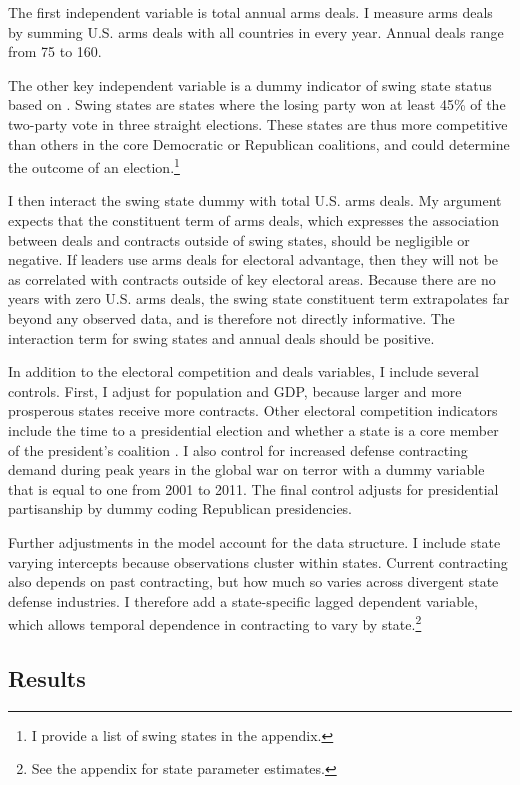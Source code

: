 \documentclass[12pt]{article}
\begin{document}
The first independent variable is total annual arms deals.  
I measure arms deals by summing U.S. arms deals with all countries in every year. 
Annual deals range from 75 to 160. 


The other key independent variable is a dummy indicator of swing state status based on \citet{KrinerReeves2015}.
Swing states are states where the losing party won at least 45\% of the two-party vote in three straight elections.
These states are thus more competitive than others in the core Democratic or Republican coalitions, and could determine the outcome of an election.\footnote{I provide a list of swing states in the appendix.}


I then interact the swing state dummy with total U.S. arms deals. 
My argument expects that the constituent term of arms deals, which expresses the association between deals and contracts outside of swing states, should be negligible or negative.
If leaders use arms deals for electoral advantage, then they will not be as correlated with contracts outside of key electoral areas. 
Because there are no years with zero U.S. arms deals, the swing state constituent term extrapolates far beyond any observed data, and is therefore not directly informative. 
The interaction term for swing states and annual deals should be positive.


In addition to the electoral competition and deals variables, I include several controls. 
First, I adjust for population and GDP, because larger and more prosperous states receive more contracts. 
Other electoral competition indicators include the time to a presidential election and whether a state is a core member of the president's coalition \citep{KrinerReeves2015}. 
I also control for increased defense contracting demand during peak years in the global war on terror with a dummy variable that is equal to one from 2001 to 2011. 
The final control adjusts for presidential partisanship by dummy coding Republican presidencies. 


Further adjustments in the model account for the data structure.
I include state varying intercepts because observations cluster within states. 
Current contracting also depends on past contracting, but how much so varies across divergent state defense industries. 
I therefore add a state-specific lagged dependent variable, which allows temporal dependence in contracting to vary by state.\footnote{See the appendix for state parameter estimates.}


\subsection{Results}
\end{document}
